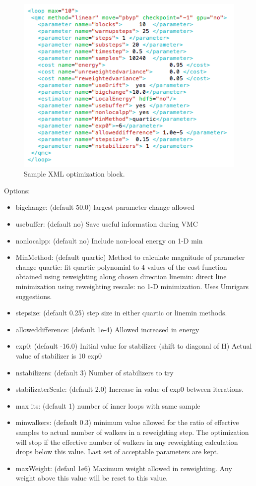 \begin{figure}[ht!]
\begin{center}
\includegraphics[trim = 0mm 0mm 0mm 0mm, clip,width=0.70\columnwidth]{figures/lab_advanced_molecules_xml_opt.png}
\end{center}
\caption{Sample XML optimization block.}
\label{fig:lam_xml_opt}
\end{figure}

Options:
\begin{itemize}
  \item{bigchange: (default 50.0) largest parameter change allowed}
  \item{usebuffer: (default no) Save useful information during VMC}
  \item{nonlocalpp: (default no) Include non-local energy on 1-D min}
  \item{MinMethod: (default quartic) Method to calculate magnitude of parameter change
quartic: fit quartic polynomial to 4 values of the cost function obtained using reweighting 
along chosen direction linemin: direct line minimization using reweighting rescale:
no 1-D minimization. Uses Umrigars suggestions.}
  \item{stepsize: (default 0.25) step size in either quartic or linemin methods.}
  \item{alloweddifference: (default 1e-4) Allowed increased in energy}
  \item{exp0: (default -16.0) Initial value for stabilizer (shift to diagonal of H) Actual value
of stabilizer is 10 exp0}
  \item{nstabilizers: (default 3) Number of stabilizers to try}
  \item{stabilizaterScale: (default 2.0) Increase in value of exp0 between iterations.}
  \item{max its: (default 1) number of inner loops with same sample}
  \item{minwalkers: (default 0.3) minimum value allowed for the ratio of effective samples
to actual number of walkers in a reweighting step. The optimization will stop if the
effective number of walkers in any reweighting calculation drops below this value. Last
set of acceptable parameters are kept.}
  \item{maxWeight: (defaul 1e6) Maximum weight allowed in reweighting. Any weight above
this value will be reset to this value.}
\end{itemize}

